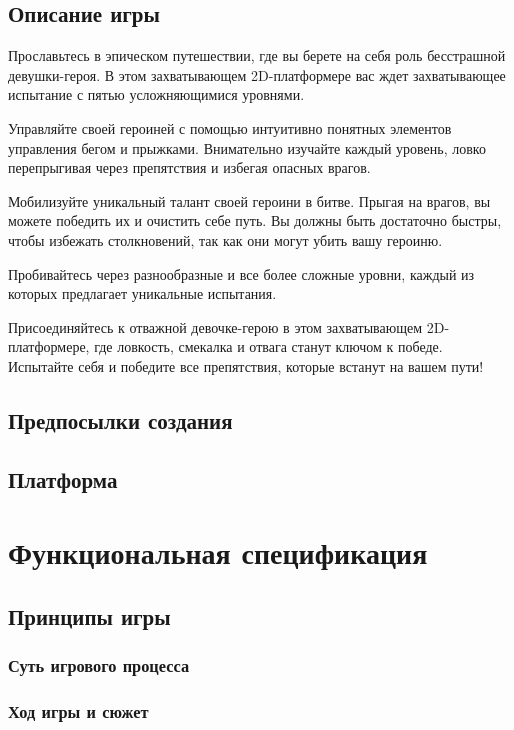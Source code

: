 \documentclass[article,12pt, fleqn]{article}
\begin{document}
\begin{itemize}
\subsection{Описание игры}
Прославьтесь в эпическом путешествии, где вы берете на себя роль бесстрашной девушки-героя. В этом захватывающем 2D-платформере вас ждет захватывающее испытание с пятью усложняющимися уровнями.\par
Управляйте своей героиней с помощью интуитивно понятных элементов управления бегом и прыжками. Внимательно изучайте каждый уровень, ловко перепрыгивая через препятствия и избегая опасных врагов. \par
Мобилизуйте уникальный талант своей героини в битве. Прыгая на врагов, вы можете победить их и очистить себе путь. Вы должны быть достаточно быстры, чтобы избежать столкновений, так как они могут убить вашу героиню.\par
Пробивайтесь через разнообразные и все более сложные уровни, каждый из которых предлагает уникальные испытания. \par
Присоединяйтесь к отважной девочке-герою в этом захватывающем 2D-платформере, где ловкость, смекалка и отвага станут ключом к победе. Испытайте себя и победите все препятствия, которые встанут на вашем пути!

\subsection{Предпосылки создания}

\subsection{Платформа}

\section{Функциональная спецификация}

\subsection{Принципы игры}

\subsubsection{Суть игрового процесса}

\subsubsection{Ход игры и сюжет}

\end{itemize}
\end{document}

